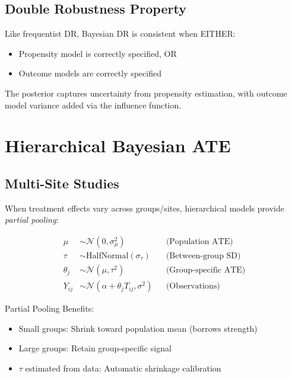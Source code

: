 \subsection{Double Robustness Property}

Like frequentist DR, Bayesian DR is consistent when EITHER:
\begin{itemize}
\item Propensity model is correctly specified, OR
\item Outcome models are correctly specified
\end{itemize}

The posterior captures uncertainty from propensity estimation, with outcome model variance added via the influence function.


\section{Hierarchical Bayesian ATE}

\subsection{Multi-Site Studies}

When treatment effects vary across groups/sites, hierarchical models provide \textit{partial pooling}:

\begin{definition}
\begin{align}
\mu &\sim \mathcal{N}(0, \sigma_\mu^2) && \text{(Population ATE)} \\
\tau &\sim \text{HalfNormal}(\sigma_\tau) && \text{(Between-group SD)} \\
\theta_j &\sim \mathcal{N}(\mu, \tau^2) && \text{(Group-specific ATE)} \\
Y_{ij} &\sim \mathcal{N}(\alpha + \theta_j T_{ij}, \sigma^2) && \text{(Observations)}
\end{align}
\end{definition}

\begin{insight}
Partial Pooling Benefits:
\begin{itemize}
\item Small groups: Shrink toward population mean (borrows strength)
\item Large groups: Retain group-specific signal
\item $\tau$ estimated from data: Automatic shrinkage calibration
\end{itemize}
\end{insight}

